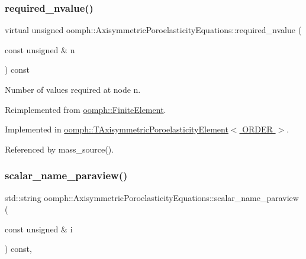 \mbox{\label{classoomph_1_1AxisymmetricPoroelasticityEquations_a926fed18368bf5e4f4f52c6817c007b5}} 
\subsubsection{\texorpdfstring{required\+\_\+nvalue()}{required\_nvalue()}}
{\footnotesize\ttfamily virtual unsigned oomph\+::\+Axisymmetric\+Poroelasticity\+Equations\+::required\+\_\+nvalue (\begin{DoxyParamCaption}\item[{const unsigned \&}]{n }\end{DoxyParamCaption}) const\hspace{0.3cm}{\ttfamily [pure virtual]}}



Number of values required at node n. 



Reimplemented from \hyperlink{classoomph_1_1FiniteElement_a56610c60d5bc2d7c27407a1455471b1a}{oomph\+::\+Finite\+Element}.



Implemented in \hyperlink{classoomph_1_1TAxisymmetricPoroelasticityElement_a4e741ac6c7cacf006e930b0793d6797f}{oomph\+::\+T\+Axisymmetric\+Poroelasticity\+Element$<$ O\+R\+D\+E\+R $>$}.



Referenced by mass\+\_\+source().

\mbox{\label{classoomph_1_1AxisymmetricPoroelasticityEquations_aac4a8c545c8223f5e72249dda357202b}} 
\subsubsection{\texorpdfstring{scalar\+\_\+name\+\_\+paraview()}{scalar\_name\_paraview()}}
{\footnotesize\ttfamily std\+::string oomph\+::\+Axisymmetric\+Poroelasticity\+Equations\+::scalar\+\_\+name\+\_\+paraview (\begin{DoxyParamCaption}\item[{const unsigned \&}]{i }\end{DoxyParamCaption}) const\hspace{0.3cm}{\ttfamily [inline]}, {\ttfamily [virtual]}}



